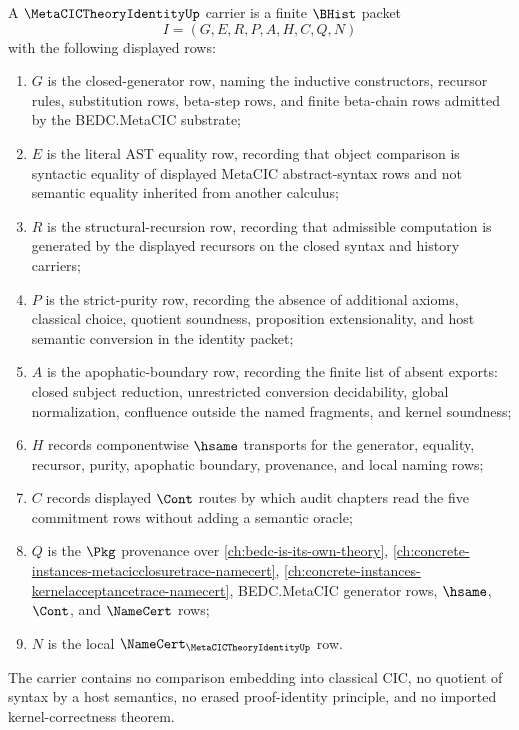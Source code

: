 \begin{definition}
\label{def:metacic-theory-identity-carrier}
A $\MetaCICTheoryIdentityUp$ carrier is a finite $\BHist$ packet
$$
I=(G,E,R,P,A,H,C,Q,N)
$$
with the following displayed rows:
\begin{enumerate}
\item $G$ is the closed-generator row, naming the inductive constructors, recursor rules, substitution rows, beta-step rows, and finite beta-chain rows admitted by the BEDC.MetaCIC substrate;
\item $E$ is the literal AST equality row, recording that object comparison is syntactic equality of displayed MetaCIC abstract-syntax rows and not semantic equality inherited from another calculus;
\item $R$ is the structural-recursion row, recording that admissible computation is generated by the displayed recursors on the closed syntax and history carriers;
\item $P$ is the strict-purity row, recording the absence of additional axioms, classical choice, quotient soundness, proposition extensionality, and host semantic conversion in the identity packet;
\item $A$ is the apophatic-boundary row, recording the finite list of absent exports: closed subject reduction, unrestricted conversion decidability, global normalization, confluence outside the named fragments, and kernel soundness;
\item $H$ records componentwise $\hsame$ transports for the generator, equality, recursor, purity, apophatic boundary, provenance, and local naming rows;
\item $C$ records displayed $\Cont$ routes by which audit chapters read the five commitment rows without adding a semantic oracle;
\item $Q$ is the $\Pkg$ provenance over \autoref{ch:bedc-is-its-own-theory}, \autoref{ch:concrete-instances-metacicclosuretrace-namecert}, \autoref{ch:concrete-instances-kernelacceptancetrace-namecert}, BEDC.MetaCIC generator rows, $\hsame$, $\Cont$, and $\NameCert$ rows;
\item $N$ is the local $\NameCert_{\MetaCICTheoryIdentityUp}$ row.
\end{enumerate}
The carrier contains no comparison embedding into classical CIC, no quotient of syntax by a host semantics, no erased proof-identity principle, and no imported kernel-correctness theorem.
\end{definition}

